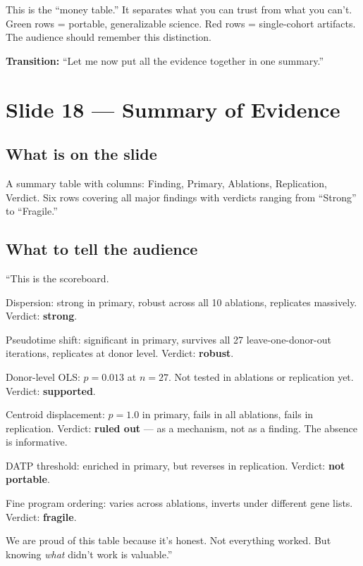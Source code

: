 \documentclass[11pt]{article}
\begin{document}
\begin{resultbox}
This is the ``money table.'' It separates what you can trust from what you can't. Green rows = portable, generalizable science. Red rows = single-cohort artifacts. The audience should remember this distinction.
\end{resultbox}

\textbf{Transition:} ``Let me now put all the evidence together in one summary.''


\section{Slide 18 --- Summary of Evidence}

\subsection{What is on the slide}

A summary table with columns: Finding, Primary, Ablations, Replication, Verdict. Six rows covering all major findings with verdicts ranging from ``Strong'' to ``Fragile.''

\subsection{What to tell the audience}

\begin{speaknote}
``This is the scoreboard.

Dispersion: strong in primary, robust across all 10 ablations, replicates massively. Verdict: \textbf{strong}.

Pseudotime shift: significant in primary, survives all 27 leave-one-donor-out iterations, replicates at donor level. Verdict: \textbf{robust}.

Donor-level OLS: $p = 0.013$ at $n = 27$. Not tested in ablations or replication yet. Verdict: \textbf{supported}.

Centroid displacement: $p = 1.0$ in primary, fails in all ablations, fails in replication. Verdict: \textbf{ruled out} --- as a mechanism, not as a finding. The absence is informative.

DATP threshold: enriched in primary, but reverses in replication. Verdict: \textbf{not portable}.

Fine program ordering: varies across ablations, inverts under different gene lists. Verdict: \textbf{fragile}.

We are proud of this table because it's honest. Not everything worked. But knowing \emph{what} didn't work is valuable.''
\end{speaknote}
\end{document}
